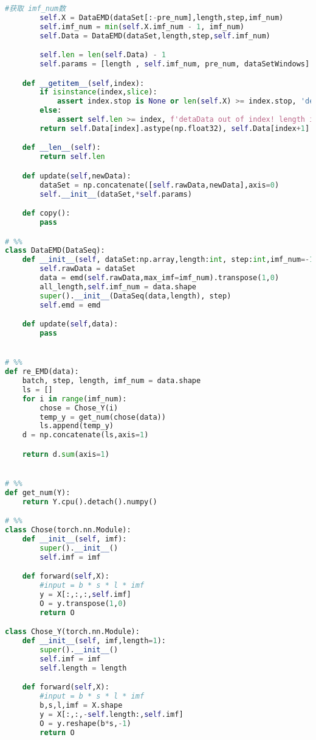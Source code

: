\begin{appendices}
\begin{lstlisting}[language=python]
        #获取 imf_num数
        self.X = DataEMD(dataSet[:-pre_num],length,step,imf_num)
        self.imf_num = min(self.X.imf_num - 1, imf_num)
        self.Data = DataEMD(dataSet,length,step,self.imf_num)

        self.len = len(self.Data) - 1
        self.params = [length , self.imf_num, pre_num, dataSetWindows]

    def __getitem__(self,index):
        if isinstance(index,slice):
            assert index.stop is None or len(self.X) >= index.stop, 'detaData out of index!'
        else:
            assert self.len >= index, f'detaData out of index! length is {self.len} but index is {index}'
        return self.Data[index].astype(np.float32), self.Data[index+1].astype(np.float32)

    def __len__(self):
        return self.len

    def update(self,newData):
        dataSet = np.concatenate([self.rawData,newData],axis=0)
        self.__init__(dataSet,*self.params)

    def copy():
        pass

# %%
class DataEMD(DataSeq):
    def __init__(self, dataSet:np.array,length:int, step:int,imf_num=-1,emd = EMD()):
        self.rawData = dataSet
        data = emd(self.rawData,max_imf=imf_num).transpose(1,0)
        all_length,self.imf_num = data.shape
        super().__init__(DataSeq(data,length), step)
        self.emd = emd

    def update(self,data):
        pass


# %%
def re_EMD(data):
    batch, step, length, imf_num = data.shape
    ls = []
    for i in range(imf_num):
        chose = Chose_Y(i)
        temp_y = get_num(chose(data))
        ls.append(temp_y)
    d = np.concatenate(ls,axis=1)

    return d.sum(axis=1)


# %%
def get_num(Y):
    return Y.cpu().detach().numpy()

# %%
class Chose(torch.nn.Module):
    def __init__(self, imf):
        super().__init__()
        self.imf = imf

    def forward(self,X):
        #input = b * s * l * imf
        y = X[:,:,:,self.imf]
        O = y.transpose(1,0)
        return O

class Chose_Y(torch.nn.Module):
    def __init__(self, imf,length=1):
        super().__init__()
        self.imf = imf
        self.length = length

    def forward(self,X):
        #input = b * s * l * imf
        b,s,l,imf = X.shape
        y = X[:,:,-self.length:,self.imf]
        O = y.reshape(b*s,-1)
        return O



\end{lstlisting}
\end{appendices}

